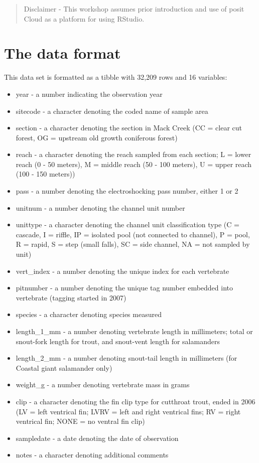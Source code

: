 \documentclass[
]{book}
\providecommand{\tightlist}{%
  \setlength{\itemsep}{0pt}\setlength{\parskip}{0pt}}
\begin{document}
\begin{quote}
Disclaimer - This workshop assumes prior introduction and use of posit Cloud as a platform for using RStudio.
\end{quote}

\hypertarget{the-data-format}{%
\section{The data format}\label{the-data-format}}

This data set is formatted as a tibble with 32,209 rows and 16 variables:

\begin{itemize}
\tightlist
\item
  year - a number indicating the observation year
\item
  sitecode - a character denoting the coded name of sample area
\item
  section - a character denoting the section in Mack Creek (CC = clear cut forest, OG = upstream old growth coniferous forest)
\item
  reach - a character denoting the reach sampled from each section; L = lower reach (0 - 50 meters), M = middle reach (50 - 100 meters), U = upper reach (100 - 150 meters))
\item
  pass - a number denoting the electroshocking pass number, either 1 or 2
\item
  unitnum - a number denoting the channel unit number
\item
  unittype - a character denoting the channel unit classification type (C = cascade, I = riffle, IP = isolated pool (not connected to channel), P = pool, R = rapid, S = step (small falls), SC = side channel, NA = not sampled by unit)
\item
  vert\_index - a number denoting the unique index for each vertebrate
\item
  pitnumber - a number denoting the unique tag number embedded into vertebrate (tagging started in 2007)
\item
  species - a character denoting species measured
\item
  length\_1\_mm - a number denoting vertebrate length in millimeters; total or snout-fork length for trout, and snout-vent length for salamanders
\item
  length\_2\_mm - a number denoting snout-tail length in millimeters (for Coastal giant salamander only)
\item
  weight\_g - a number denoting vertebrate mass in grams
\item
  clip - a character denoting the fin clip type for cutthroat trout, ended in 2006 (LV = left ventrical fin; LVRV = left and right ventrical fins; RV = right ventrical fin; NONE = no ventral fin clip)
\item
  sampledate - a date denoting the date of observation
\item
  notes - a character denoting additional comments
\end{itemize}
\end{document}

